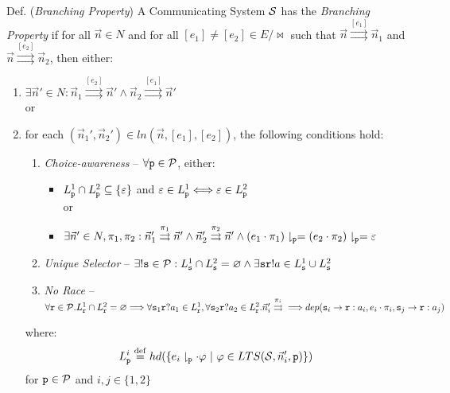 Def. (\emph{Branching Property}) A Communicating System $\mathcal{S}$
has the \emph{Branching Property} if for all $\vec{n} \in N$ and for
all $[e_1] \neq [e_2] \in E/\bowtie$ such that $\vec{n}
\stackrel{[e_1]}\rightrightarrows \vec{n}_1$ and $\vec{n}
\stackrel{[e_2]}\rightrightarrows \vec{n}_2$, then either:
\begin{enumerate}
  \item $\exists\vec{n}' \in N :
    \vec{n}_1\stackrel{[e_2]}\rightrightarrows\vec{n}' \wedge
    \vec{n}_2\stackrel{[e_1]}\rightrightarrows\vec{n}'$ \\ or
  \item for each $(\vec{n}_1',\vec{n}_2') \in ln(\vec{n},[e_1],[e_2])$,
    the following conditions hold:
    \begin{enumerate}
      \item \emph{Choice-awareness} -- $\forall\mathtt{p}\in\mathcal{P}$,
        either:
        \begin{itemize}
          \item $L_\mathtt{p}^1 \cap L_\mathtt{p}^2 \subseteq
            \{\varepsilon\}$ and $\varepsilon \in L_\mathtt{p}^1
              \Longleftrightarrow \varepsilon \in L_\mathtt{p}^2$ \\
            or
          \item $\exists\vec{n}'\in{N},\pi_1,\pi_2 :
            \vec{n}_1'\stackrel{\pi_1}\rightrightarrows\vec{n}' \wedge
            \vec{n}_2'\stackrel{\pi_2}\rightrightarrows\vec{n}' \wedge
            (e_1\cdot\pi_1)\downharpoonright_\mathtt{p} =
            (e_2\cdot\pi_2)\downharpoonright_\mathtt{p} = \varepsilon$
        \end{itemize}
      \item \emph{Unique Selector} -- $\exists!\mathtt{s}\in\mathcal{P} :
        L_\mathtt{s}^1 \cap L_\mathtt{s}^2 = \varnothing \wedge
        \exists\mathtt{sr}!a \in L_\mathtt{s}^1 \cup L_\mathtt{s}^2$
      \item \emph{No Race} -- $\forall\mathtt{r}\in\mathcal{P} .
        L_\mathtt{r}^1 \cap L_\mathtt{r}^2 = \varnothing \\
        \Longrightarrow
          \forall\mathtt{s}_1\mathtt{r}?a_1\in{L_\mathtt{r}^1},
          \forall\mathtt{s}_2\mathtt{r}?a_2\in{L_\mathtt{r}^2} .
          \vec{n}'_i\stackrel{\pi_i}\rightrightarrows \\
        \Longrightarrow
          dep(\mathtt{s}_i\rightarrow\mathtt{r}:a_i,e_i\cdot\pi_i,
            \mathtt{s}_j\rightarrow\mathtt{r}:a_j)$ \\
    \end{enumerate}
    where:
    \[
      L_\mathtt{p}^i \stackrel{\mathrm{def}}=
        hd(\{ e_i\downharpoonright_\mathtt{p}\cdot\varphi
        \ |\ \varphi \in LTS(\mathcal{S},\vec{n}_i',\mathtt{p}) \})
    \]
    for $\mathtt{p} \in \mathcal{P}$ and $i,j \in \{1,2\}$
\end{enumerate}

